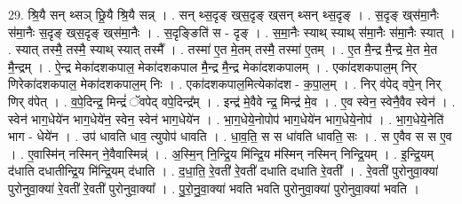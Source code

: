\documentclass[17pt]{extarticle}
\begin{document}
29. श्रि॒यै सन् थ्सञ् छ्रि॒यै श्रि॒यै सन्न् । . सन् थ्स॒दृङ् ख्‌स॒दृङ् ख्‌सन् थ्सन् थ्स॒दृङ् । . स॒दृङ् ख्‌स॑मा॒नैः स॑मा॒नैः स॒दृङ् ख्‌स॒दृङ् ख्‌स॑मा॒नैः । . स॒दृङ्ङिति॑ स - दृङ् । . स॒मा॒नैः स्याथ् स्याथ् स॑मा॒नैः स॑मा॒नैः स्यात् । . स्यात् तस्मै॒ तस्मै॒ स्याथ् स्यात् तस्मै᳚ । . तस्मा॑ ए॒त मे॒तम् तस्मै॒ तस्मा॑ ए॒तम् । . ए॒त मै॒न्द्र मै॒न्द्र मे॒त मे॒त मै॒न्द्रम् । . ऐ॒न्द्र मेका॑दशकपाल॒ मेका॑दशकपाल मै॒न्द्र मै॒न्द्र मेका॑दशकपालम् । . एका॑दशकपाल॒म् निर् णिरेका॑दशकपाल॒ मेका॑दशकपाल॒म् निः । . एका॑दशकपाल॒मित्येका॑दश - क॒पा॒ल॒म् । . निर् व॑पेद् वपे॒न् निर् णिर् व॑पेत् । . व॒पे॒दिन्द्र॒ मिन्द्रं॑ ॅवपेद् वपे॒दिन्द्र᳚म् । . इन्द्र॑ मे॒वैवे न्द्र॒ मिन्द्र॑ मे॒व । . ए॒व स्वेन॒ स्वेनै॒वैव स्वेन॑ । . स्वेन॑ भाग॒धेये॑न भाग॒धेये॑न॒ स्वेन॒ स्वेन॑ भाग॒धेये॑न । . भा॒ग॒धेये॒नोपोप॑ भाग॒धेये॑न भाग॒धेये॒नोप॑ । . भा॒ग॒धेये॒नेति॑ भाग - धेये॑न । . उप॑ धावति धाव॒ त्युपोप॑ धावति । . धा॒व॒ति॒ स स धा॑वति धावति॒ सः । . स ए॒वैव स स ए॒व । . ए॒वास्मि॑न् नस्मिन् ने॒वैवास्मिन्न्॑ । . अ॒स्मि॒न् नि॒न्द्रि॒य मि॑न्द्रि॒य म॑स्मिन् नस्मिन् निन्द्रि॒यम् । . इ॒न्द्रि॒यम् द॑धाति दधातीन्द्रि॒य मि॑न्द्रि॒यम् द॑धाति । . द॒धा॒ति॒ रे॒वती॑ रे॒वती॑ दधाति दधाति रे॒वती᳚ । . रे॒वती॑ पुरोनुवा॒क्या॑ पुरोनुवा॒क्या॑ रे॒वती॑ रे॒वती॑ पुरोनुवा॒क्या᳚ । . पु॒रो॒नु॒वा॒क्या॑ भवति भवति पुरोनुवा॒क्या॑ पुरोनुवा॒क्या॑ भवति । \newline
\end{document}
